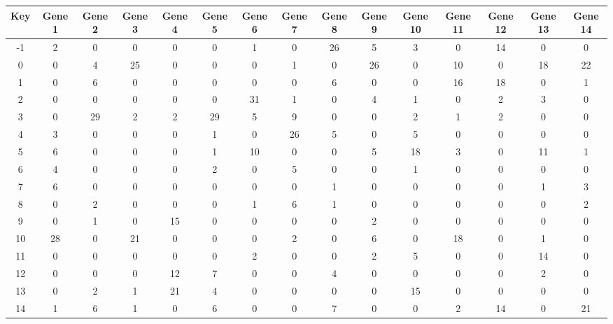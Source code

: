 \begin{tabular}{|c|c|c|c|c|c|c|c|c|c|c|c|c|c|c|}
\hline
Key & Gene 1 & Gene 2 & Gene 3 & Gene 4 & Gene 5 & Gene 6 & Gene 7 & Gene 8 & Gene 9 & Gene 10 & Gene 11 & Gene 12 & Gene 13 & Gene 14 \\
\hline
-1 & 2 & 0 & 0 & 0 & 0 & 1 & 0 & 26 & 5 & 3 & 0 & 14 & 0 & 0 \\
0 & 0 & 4 & 25 & 0 & 0 & 0 & 1 & 0 & 26 & 0 & 10 & 0 & 18 & 22 \\
1 & 0 & 6 & 0 & 0 & 0 & 0 & 0 & 6 & 0 & 0 & 16 & 18 & 0 & 1 \\
2 & 0 & 0 & 0 & 0 & 0 & 31 & 1 & 0 & 4 & 1 & 0 & 2 & 3 & 0 \\
3 & 0 & 29 & 2 & 2 & 29 & 5 & 9 & 0 & 0 & 2 & 1 & 2 & 0 & 0 \\
4 & 3 & 0 & 0 & 0 & 1 & 0 & 26 & 5 & 0 & 5 & 0 & 0 & 0 & 0 \\
5 & 6 & 0 & 0 & 0 & 1 & 10 & 0 & 0 & 5 & 18 & 3 & 0 & 11 & 1 \\
6 & 4 & 0 & 0 & 0 & 2 & 0 & 5 & 0 & 0 & 1 & 0 & 0 & 0 & 0 \\
7 & 6 & 0 & 0 & 0 & 0 & 0 & 0 & 1 & 0 & 0 & 0 & 0 & 1 & 3 \\
8 & 0 & 2 & 0 & 0 & 0 & 1 & 6 & 1 & 0 & 0 & 0 & 0 & 0 & 2 \\
9 & 0 & 1 & 0 & 15 & 0 & 0 & 0 & 0 & 2 & 0 & 0 & 0 & 0 & 0 \\
10 & 28 & 0 & 21 & 0 & 0 & 0 & 2 & 0 & 6 & 0 & 18 & 0 & 1 & 0 \\
11 & 0 & 0 & 0 & 0 & 0 & 2 & 0 & 0 & 2 & 5 & 0 & 0 & 14 & 0 \\
12 & 0 & 0 & 0 & 12 & 7 & 0 & 0 & 4 & 0 & 0 & 0 & 0 & 2 & 0 \\
13 & 0 & 2 & 1 & 21 & 4 & 0 & 0 & 0 & 0 & 15 & 0 & 0 & 0 & 0 \\
14 & 1 & 6 & 1 & 0 & 6 & 0 & 0 & 7 & 0 & 0 & 2 & 14 & 0 & 21 \\
\hline
\end{tabular}